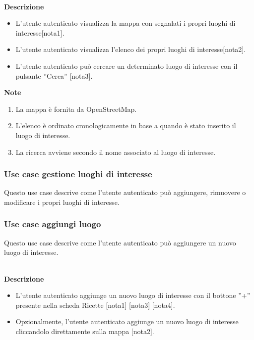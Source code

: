 \documentclass[a4paper,12pt]{article}
\begin{document}
\textbf{\\Descrizione}
\begin{itemize} \setlength\itemsep{0.01em}
\item L'utente autenticato visualizza la mappa con segnalati i propri luoghi di interesse[nota1].
\item L'utente autenticato visualizza l'elenco dei propri luoghi di interesse[nota2].
\item L'utente autenticato può cercare un determinato luogo di interesse con il pulsante ''Cerca'' [nota3].
\end{itemize}

\textbf{Note}
\begin{enumerate} \setlength\itemsep{0.01em}
\item La mappa è fornita da OpenStreetMap.
\item L'elenco è ordinato cronologicamente in base a quando è stato inserito il luogo di interesse.
\item La ricerca avviene secondo il nome associato al luogo di interesse.
\end{enumerate}




\subsubsection*{Use case gestione luoghi di interesse}

Questo use case descrive come l'utente autenticato può aggiungere, rimuovere o modificare i propri luoghi di interesse.



\subsubsection*{Use case aggiungi luogo}

Questo use case descrive come l'utente autenticato può aggiungere un nuovo luogo di interesse.

\textbf{\\Descrizione}
\begin{itemize} \setlength\itemsep{0.01em}
\item L'utente autenticato aggiunge un nuovo luogo di interesse con il bottone ''+'' presente nella scheda Ricette [nota1] [nota3] [nota4].
\item Opzionalmente, l'utente autenticato aggiunge un nuovo luogo di interesse cliccandolo direttamente sulla mappa [nota2].
\end{itemize}
\end{document}
